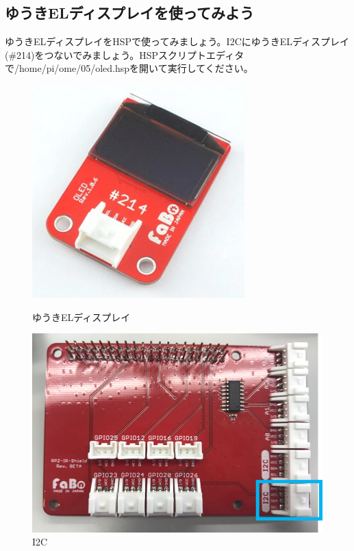 \subsection{ゆうきELディスプレイを使ってみよう}
ゆうきELディスプレイをHSPで使ってみましょう。I2CにゆうきELディスプレイ(\#214)をつないでみましょう。HSPスクリプトエディタで/home/pi/ome/05/oled.hspを開いて実行してください。
\begin{figure}[H]
  \begin{minipage}[t]{0.3\columnwidth}
    \centering
 \includegraphics[width=\linewidth]{images/chap05/text05-img032.png}
    \caption{ゆうきELディスプレイ}
  \end{minipage}
  \begin{minipage}[t]{0.5\columnwidth}
    \centering
    \includegraphics[width=\linewidth]{images/chap05/text05-img033.png}
    \caption{I2C}
  \end{minipage}
\end{figure}

